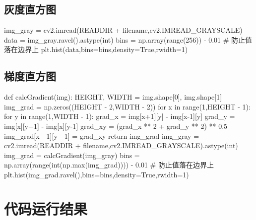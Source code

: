 \documentclass[12pt,a4paper]{article}
\begin{document}
\subsection{灰度直方图}
\begin{python}
img_gray = cv2.imread(READDIR + filename,cv2.IMREAD_GRAYSCALE)
data = img_gray.ravel().astype(int)
bins = np.array(range(256))  - 0.01  # 防止值落在边界上
plt.hist(data,bins=bins,density=True,rwidth=1)

\end{python}

\subsection{梯度直方图}
\begin{python}
def calcGradient(img):
    HEIGHT, WIDTH = img.shape[0], img.shape[1]
    img_grad = np.zeros((HEIGHT - 2,WIDTH - 2))
    for x in range(1,HEIGHT - 1):
        for y in range(1,WIDTH - 1):
            grad_x = img[x+1][y] - img[x-1][y]
            grad_y = img[x][y+1] - img[x][y-1]
            grad_xy = (grad_x ** 2 + grad_y ** 2) ** 0.5
            img_grad[x - 1][y - 1] = grad_xy
    return img_grad
img_gray = cv2.imread(READDIR + filename,cv2.IMREAD_GRAYSCALE).astype(int)
img_grad = calcGradient(img_gray)
bins = np.array(range(int(np.max(img_grad))))  - 0.01  # 防止值落在边界上
plt.hist(img_grad.ravel(),bins=bins,density=True,rwidth=1)
    

\end{python}

\section{代码运行结果}
\end{document}
